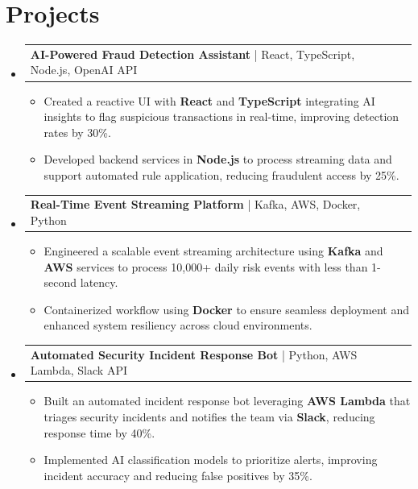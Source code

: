\documentclass[letterpaper,11pt]{article}
\makeatletter
\newcommand{\resumeItem}[1]{
  \item\footnotesize{
    {#1 \vspace{-2pt}}
  }
}
\newcommand{\resumeProjectHeading}[2]{
    \item
    \begin{tabular*}{1.001\textwidth}{l@{\extracolsep{\fill}}r}
      \small#1 & \textbf{\small #2}\\
    \end{tabular*}\vspace{-7pt}
}
\newcommand{\resumeSubHeadingListStart}{\begin{itemize}[leftmargin=0pt, label={}]}
\newcommand{\resumeSubHeadingListEnd}{\end{itemize}}
\newcommand{\resumeItemListStart}{\begin{itemize}[leftmargin=*]}
\newcommand{\resumeItemListEnd}{\end{itemize}\vspace{-5pt}}
\makeatother
\begin{document}
\section{Projects}
    \vspace{-5pt}
    \resumeSubHeadingListStart
      \resumeProjectHeading
          {\textbf{AI-Powered Fraud Detection Assistant} | React, TypeScript, Node.js, OpenAI API}{}
          \resumeItemListStart
              \resumeItem{Created a reactive UI with \textbf{React} and \textbf{TypeScript} integrating AI insights to flag suspicious transactions in real-time, improving detection rates by 30\%.}
              \resumeItem{Developed backend services in \textbf{Node.js} to process streaming data and support automated rule application, reducing fraudulent access by 25\%.}
          \resumeItemListEnd
          \vspace{-12pt}
      \resumeProjectHeading
          {\textbf{Real-Time Event Streaming Platform} | Kafka, AWS, Docker, Python}{}
          \resumeItemListStart
              \resumeItem{Engineered a scalable event streaming architecture using \textbf{Kafka} and \textbf{AWS} services to process 10,000+ daily risk events with less than 1-second latency.}
              \resumeItem{Containerized workflow using \textbf{Docker} to ensure seamless deployment and enhanced system resiliency across cloud environments.}
          \resumeItemListEnd
          \vspace{-12pt}
      \resumeProjectHeading
          {\textbf{Automated Security Incident Response Bot} | Python, AWS Lambda, Slack API}{}
          \resumeItemListStart
              \resumeItem{Built an automated incident response bot leveraging \textbf{AWS Lambda} that triages security incidents and notifies the team via \textbf{Slack}, reducing response time by 40\%.}
              \resumeItem{Implemented AI classification models to prioritize alerts, improving incident accuracy and reducing false positives by 35\%.}
          \resumeItemListEnd 
    \resumeSubHeadingListEnd
\end{document}
